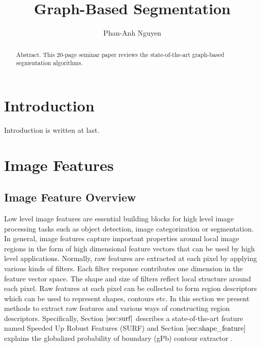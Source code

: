 \documentclass{SMBV12}
\begin{document}
\title{Graph-Based Segmentation}

\author{Phan-Anh Nguyen}

\maketitle


\begin{abstract}%
Abstract. This 20-page seminar paper reviews the state-of-the-art graph-based segmentation algorithms.
\end{abstract}



%
\section{Introduction}

Introduction is written at last.

%
\section{Image Features}

\subsection{Image Feature Overview}
Low level image features are essential building blocks for high level image processing tasks such as object detection, image categorization or segmentation. In general, image features capture important properties around local image regions in the form of high dimensional feature vectors that can be used by high level applications. Normally, raw features are extracted at each pixel by applying various kinds of filters. Each filter response contributes one dimension in the feature vector space. The shape and size of filters reflect local structure around each pixel. Raw features at each pixel can be collected to form region descriptors which can be used to represent shapes, contours etc. In this section we present methods to extract raw features and various ways of constructing region descriptors. Specifically, Section $\ref{sec:surf}$ describes a state-of-the-art feature named Speeded Up Robust Features (SURF) \cite{bay2006surf} and Section $\ref{sec:shape_feature}$ explains the globalized probability of boundary (gPb) contour extractor \cite{maire2008using}.
\end{document}

